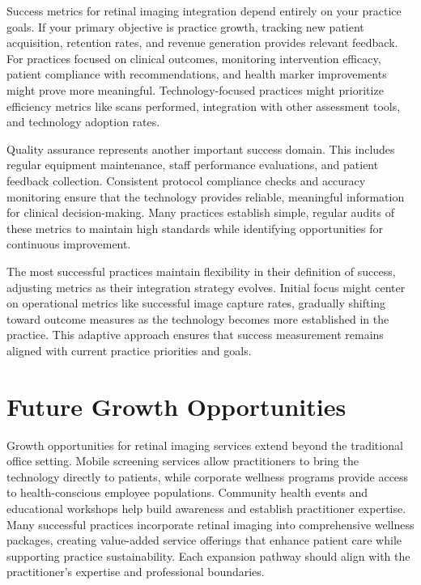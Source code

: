 \documentclass[
  Letterpaper,
]{scrbook}
\begin{document}
Success metrics for retinal imaging integration depend entirely on your
practice goals. If your primary objective is practice growth, tracking
new patient acquisition, retention rates, and revenue generation
provides relevant feedback. For practices focused on clinical outcomes,
monitoring intervention efficacy, patient compliance with
recommendations, and health marker improvements might prove more
meaningful. Technology-focused practices might prioritize efficiency
metrics like scans performed, integration with other assessment tools,
and technology adoption rates.

Quality assurance represents another important success domain. This
includes regular equipment maintenance, staff performance evaluations,
and patient feedback collection. Consistent protocol compliance checks
and accuracy monitoring ensure that the technology provides reliable,
meaningful information for clinical decision-making. Many practices
establish simple, regular audits of these metrics to maintain high
standards while identifying opportunities for continuous improvement.

The most successful practices maintain flexibility in their definition
of success, adjusting metrics as their integration strategy evolves.
Initial focus might center on operational metrics like successful image
capture rates, gradually shifting toward outcome measures as the
technology becomes more established in the practice. This adaptive
approach ensures that success measurement remains aligned with current
practice priorities and goals.

\section{Future Growth Opportunities}\label{future-growth-opportunities}

Growth opportunities for retinal imaging services extend beyond the
traditional office setting. Mobile screening services allow
practitioners to bring the technology directly to patients, while
corporate wellness programs provide access to health-conscious employee
populations. Community health events and educational workshops help
build awareness and establish practitioner expertise. Many successful
practices incorporate retinal imaging into comprehensive wellness
packages, creating value-added service offerings that enhance patient
care while supporting practice sustainability. Each expansion pathway
should align with the practitioner's expertise and professional
boundaries.
\end{document}
